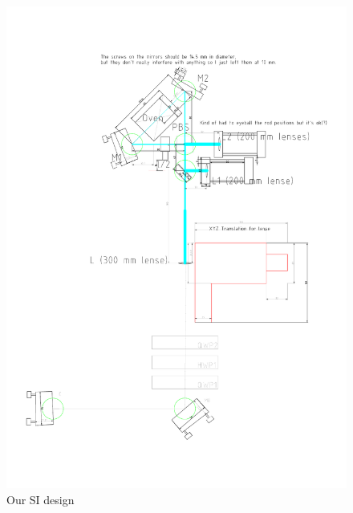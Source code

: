 \begin{figure}[H]
\begin{center}
	\includegraphics[scale=0.4]{Sagnac_Larger_300mm_Lens.pdf}
\end{center}
\caption{Our SI design}
\label{fig:SI}
\end{figure}

